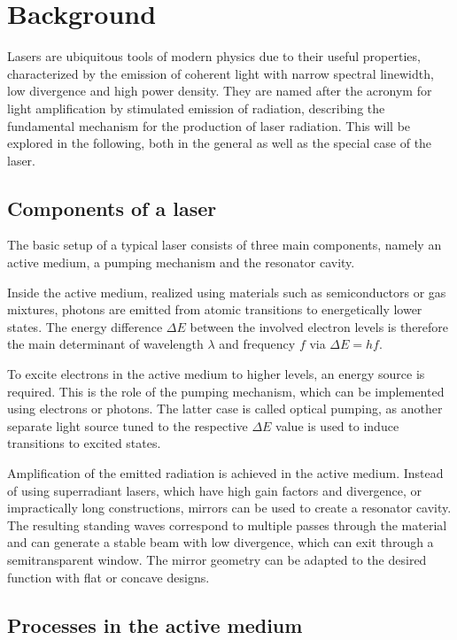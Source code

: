 \section[Background]{Background \textnormal{\cite{Eichler_2018}}}

Lasers are ubiquitous tools of modern physics due to their useful properties, characterized by the emission of coherent light with narrow
spectral linewidth, low divergence and high power density. They are named after the acronym for light amplification by stimulated emission
of radiation, describing the fundamental mechanism for the production of laser radiation. This will be explored in the following, both in
the general as well as the special case of the \HeNe laser.

\subsection{Components of a laser}

The basic setup of a typical laser consists of three main components, namely an active medium, a pumping mechanism and the resonator cavity.

Inside the active medium, realized using materials such as semiconductors or gas mixtures, photons are emitted from atomic transitions to
energetically lower states. The energy difference $\Delta E$ between the involved electron levels is therefore the main determinant
of wavelength $\lambda$ and frequency $f$ via $\Delta E = hf$.

To excite electrons in the active medium to higher levels, an energy source is required. This is the role of the pumping mechanism, which
can be implemented using electrons or photons. The latter case is called optical pumping, as another separate light source tuned to the
respective $\Delta E$ value is used to induce transitions to excited states.

Amplification of the emitted radiation is achieved in the active medium. Instead of using superradiant lasers, which have high gain factors
and divergence, or impractically long constructions, mirrors can be used to create a resonator cavity. The resulting standing waves correspond
to multiple passes through the material and can generate a stable beam with low divergence, which can exit through a semitransparent window.
The mirror geometry can be adapted to the desired function with flat or concave designs.



\subsection{Processes in the active medium}

